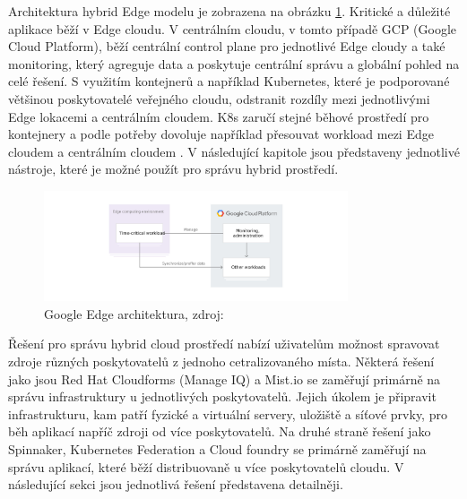 	Architektura hybrid Edge modelu je zobrazena na obrázku \ref{fig:edge}. Kritické a důležité aplikace běží v Edge cloudu. V centrálním cloudu, v tomto případě GCP (Google Cloud Platform), běží centrální control plane pro jednotlivé Edge cloudy a také monitoring, který agreguje data a poskytuje centrální správu a globální pohled na celé \linebreak řešení. S využitím kontejnerů a například Kubernetes, které je podporované většinou poskytovatelé veřejného cloudu, odstranit rozdíly mezi jednotlivými Edge lokacemi a centrálním cloudem. K8s zaručí stejné běhové prostředí pro kontejnery a podle potřeby dovoluje například přesouvat workload mezi Edge cloudem a centrálním cloudem \cite{google-edge}. V následující kapitole jsou představeny jednotlivé nástroje, které je možné použít \linebreak pro správu hybrid prostředí.
\par

\begin{figure}[H]
  \begin{centering}
	  \includegraphics[width=0.8\textwidth]{images/edge.jpg}
    \par
	  \caption{Google Edge architektura\label{fig:edge}, zdroj: }
    \end{centering}
\end{figure}

Řešení pro správu hybrid cloud prostředí nabízí uživatelům možnost spravovat zdroje různých poskytovatelů z jednoho cetralizovaného místa. Některá řešení jako jsou Red Hat Cloudforms (Manage IQ) a Mist.io se zaměřují primárně na správu infrastruktury u jednotlivých poskytovatelů. Jejich úkolem je připravit infrastrukturu, kam patří fyzické a virtuální servery, uložiště a síťové prvky, pro běh aplikací napříč zdroji \linebreak od více poskytovatelů. Na druhé straně řešení jako Spinnaker, Kubernetes Federation a Cloud foundry se primárně zaměřují na správu aplikací, které běží distribuovaně \linebreak u více poskytovatelů cloudu. V následující sekci jsou jednotlivá řešení představena detailněji. 


